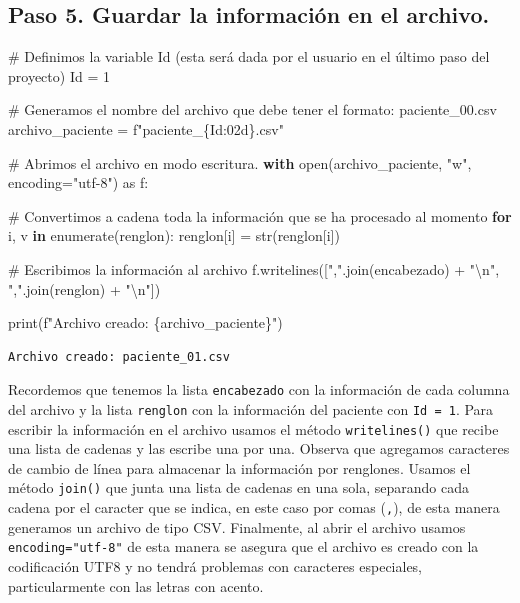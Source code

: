 \documentclass[
  spanish,
  letterpaper,
]{scrbook}
\newenvironment{Shaded}{\begin{snugshade}}{\end{snugshade}}
\newcommand{\BuiltInTok}[1]{\textcolor[rgb]{0.00,0.23,0.31}{#1}}
\newcommand{\CharTok}[1]{\textcolor[rgb]{0.13,0.47,0.30}{#1}}
\newcommand{\CommentTok}[1]{\textcolor[rgb]{0.37,0.37,0.37}{#1}}
\newcommand{\ControlFlowTok}[1]{\textcolor[rgb]{0.00,0.23,0.31}{\textbf{#1}}}
\newcommand{\DecValTok}[1]{\textcolor[rgb]{0.68,0.00,0.00}{#1}}
\newcommand{\ImportTok}[1]{\textcolor[rgb]{0.00,0.46,0.62}{#1}}
\newcommand{\KeywordTok}[1]{\textcolor[rgb]{0.00,0.23,0.31}{\textbf{#1}}}
\newcommand{\NormalTok}[1]{\textcolor[rgb]{0.00,0.23,0.31}{#1}}
\newcommand{\OperatorTok}[1]{\textcolor[rgb]{0.37,0.37,0.37}{#1}}
\newcommand{\SpecialCharTok}[1]{\textcolor[rgb]{0.37,0.37,0.37}{#1}}
\newcommand{\SpecialStringTok}[1]{\textcolor[rgb]{0.13,0.47,0.30}{#1}}
\newcommand{\StringTok}[1]{\textcolor[rgb]{0.13,0.47,0.30}{#1}}
\theoremstyle{definition}
\theoremstyle{remark}
\begin{document}
\subsection{Paso 5. Guardar la información en el
archivo.}\label{paso-5.-guardar-la-informaciuxf3n-en-el-archivo.}

\begin{Shaded}
\begin{Highlighting}[]
\CommentTok{\# Definimos la variable Id (esta será dada por el usuario en el último paso del proyecto)}
\NormalTok{Id }\OperatorTok{=} \DecValTok{1}

\CommentTok{\# Generamos el nombre del archivo que debe tener el formato: \textquotesingle{}paciente\_00.csv\textquotesingle{}}
\NormalTok{archivo\_paciente }\OperatorTok{=} \SpecialStringTok{f"paciente\_}\SpecialCharTok{\{}\NormalTok{Id}\SpecialCharTok{:02d\}}\SpecialStringTok{.csv"}

\CommentTok{\# Abrimos el archivo en modo escritura.}
\ControlFlowTok{with} \BuiltInTok{open}\NormalTok{(archivo\_paciente, }\StringTok{"w"}\NormalTok{, encoding}\OperatorTok{=}\StringTok{"utf{-}8"}\NormalTok{) }\ImportTok{as}\NormalTok{ f:}

    \CommentTok{\# Convertimos a cadena toda la información que se ha procesado al momento}
    \ControlFlowTok{for}\NormalTok{ i, v }\KeywordTok{in} \BuiltInTok{enumerate}\NormalTok{(renglon):}
\NormalTok{        renglon[i] }\OperatorTok{=} \BuiltInTok{str}\NormalTok{(renglon[i])}

    \CommentTok{\# Escribimos la información al archivo}
\NormalTok{    f.writelines([}\StringTok{","}\NormalTok{.join(encabezado) }\OperatorTok{+} \StringTok{"}\CharTok{\textbackslash{}n}\StringTok{"}\NormalTok{,}
                  \StringTok{","}\NormalTok{.join(renglon) }\OperatorTok{+} \StringTok{"}\CharTok{\textbackslash{}n}\StringTok{"}\NormalTok{])}

\BuiltInTok{print}\NormalTok{(}\SpecialStringTok{f"Archivo creado: }\SpecialCharTok{\{}\NormalTok{archivo\_paciente}\SpecialCharTok{\}}\SpecialStringTok{"}\NormalTok{)}
\end{Highlighting}
\end{Shaded}

\begin{verbatim}
Archivo creado: paciente_01.csv
\end{verbatim}

Recordemos que tenemos la lista \texttt{encabezado} con la información
de cada columna del archivo y la lista \texttt{renglon} con la
información del paciente con \texttt{Id\ =\ 1}. Para escribir la
información en el archivo usamos el método \texttt{writelines()} que
recibe una lista de cadenas y las escribe una por una. Observa que
agregamos caracteres de cambio de línea para almacenar la información
por renglones. Usamos el método \texttt{join()} que junta una lista de
cadenas en una sola, separando cada cadena por el caracter que se
indica, en este caso por comas (\texttt{,}), de esta manera generamos un
archivo de tipo CSV. Finalmente, al abrir el archivo usamos
\texttt{encoding="utf-8"} de esta manera se asegura que el archivo es
creado con la codificación UTF8 y no tendrá problemas con caracteres
especiales, particularmente con las letras con acento.
\end{document}
